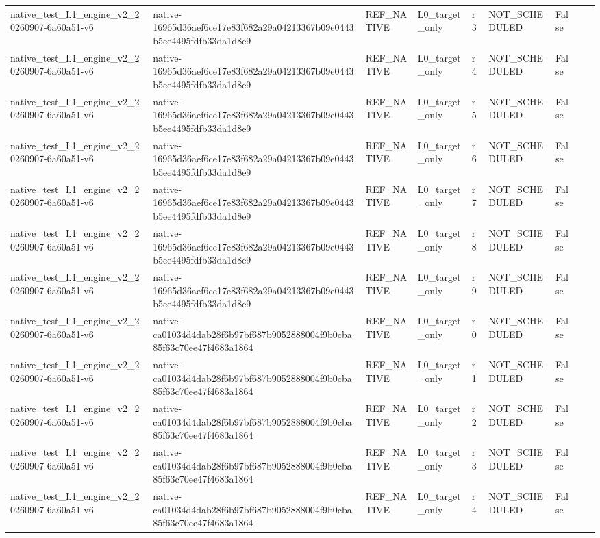 \begin{tabular}{lllllllll}
native\_test\_L1\_engine\_v2\_20260907-6a60a51-v6 & native-16965d36aef6ce17e83f682a29a04213367b09e0443b5ee4495fdfb33da1d8e9 & REF\_NATIVE & L0\_target\_only & r3 & NOT\_SCHEDULED & False &  &  \\
native\_test\_L1\_engine\_v2\_20260907-6a60a51-v6 & native-16965d36aef6ce17e83f682a29a04213367b09e0443b5ee4495fdfb33da1d8e9 & REF\_NATIVE & L0\_target\_only & r4 & NOT\_SCHEDULED & False &  &  \\
native\_test\_L1\_engine\_v2\_20260907-6a60a51-v6 & native-16965d36aef6ce17e83f682a29a04213367b09e0443b5ee4495fdfb33da1d8e9 & REF\_NATIVE & L0\_target\_only & r5 & NOT\_SCHEDULED & False &  &  \\
native\_test\_L1\_engine\_v2\_20260907-6a60a51-v6 & native-16965d36aef6ce17e83f682a29a04213367b09e0443b5ee4495fdfb33da1d8e9 & REF\_NATIVE & L0\_target\_only & r6 & NOT\_SCHEDULED & False &  &  \\
native\_test\_L1\_engine\_v2\_20260907-6a60a51-v6 & native-16965d36aef6ce17e83f682a29a04213367b09e0443b5ee4495fdfb33da1d8e9 & REF\_NATIVE & L0\_target\_only & r7 & NOT\_SCHEDULED & False &  &  \\
native\_test\_L1\_engine\_v2\_20260907-6a60a51-v6 & native-16965d36aef6ce17e83f682a29a04213367b09e0443b5ee4495fdfb33da1d8e9 & REF\_NATIVE & L0\_target\_only & r8 & NOT\_SCHEDULED & False &  &  \\
native\_test\_L1\_engine\_v2\_20260907-6a60a51-v6 & native-16965d36aef6ce17e83f682a29a04213367b09e0443b5ee4495fdfb33da1d8e9 & REF\_NATIVE & L0\_target\_only & r9 & NOT\_SCHEDULED & False &  &  \\
native\_test\_L1\_engine\_v2\_20260907-6a60a51-v6 & native-ca01034d4dab28f6b97bf687b9052888004f9b0cba85f63c70ee47f4683a1864 & REF\_NATIVE & L0\_target\_only & r0 & NOT\_SCHEDULED & False &  &  \\
native\_test\_L1\_engine\_v2\_20260907-6a60a51-v6 & native-ca01034d4dab28f6b97bf687b9052888004f9b0cba85f63c70ee47f4683a1864 & REF\_NATIVE & L0\_target\_only & r1 & NOT\_SCHEDULED & False &  &  \\
native\_test\_L1\_engine\_v2\_20260907-6a60a51-v6 & native-ca01034d4dab28f6b97bf687b9052888004f9b0cba85f63c70ee47f4683a1864 & REF\_NATIVE & L0\_target\_only & r2 & NOT\_SCHEDULED & False &  &  \\
native\_test\_L1\_engine\_v2\_20260907-6a60a51-v6 & native-ca01034d4dab28f6b97bf687b9052888004f9b0cba85f63c70ee47f4683a1864 & REF\_NATIVE & L0\_target\_only & r3 & NOT\_SCHEDULED & False &  &  \\
native\_test\_L1\_engine\_v2\_20260907-6a60a51-v6 & native-ca01034d4dab28f6b97bf687b9052888004f9b0cba85f63c70ee47f4683a1864 & REF\_NATIVE & L0\_target\_only & r4 & NOT\_SCHEDULED & False &  &  \\

\end{tabular}
